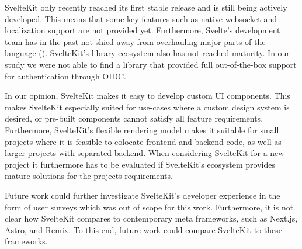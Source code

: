 SvelteKit only recently reached its first stable release and is still being actively developed. This means that some key features such as native websocket and localization support are not provided yet. Furthermore, Svelte's development team has in the past not shied away from overhauling major parts of the language (). SvelteKit's library ecosystem also has not reached maturity. In our study we were not able to find a library that provided full out-of-the-box support for authentication through OIDC.

In our opinion, SvelteKit makes it easy to develop custom UI components. This makes SvelteKit especially suited for use-cases where a custom design system is desired, or pre-built components cannot satisfy all feature requirements. Furthermore, SvelteKit's flexible rendering model makes it suitable for small projects where it is feasible to colocate frontend and backend code, as well as larger projects with separated backend. When considering SvelteKit for a new project it furthermore has to be evaluated if SvelteKit's ecosystem provides mature solutions for the projects requirements.


Future work could further investigate SvelteKit's developer experience in the form of user surveys which was out of scope for this work. Furthermore, it is not clear how SvelteKit compares to contemporary meta frameworks, such as Next.js, Astro, and Remix. To this end, future work could compare SvelteKit to these frameworks. 
